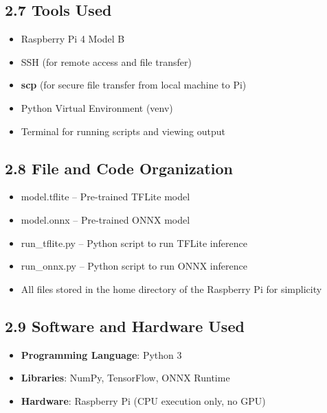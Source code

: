 \documentclass[12pt]{article}
\begin{document}
\subsection*{2.7 Tools Used}
\begin{itemize}
\item Raspberry Pi 4 Model B

\item SSH (for remote access and file transfer)

\item \textbf{scp} (for secure file transfer from local machine to Pi)

\item Python Virtual Environment (venv)

\item Terminal for running scripts and viewing output

\end{itemize}

\subsection*{2.8 File and Code Organization}
\begin{itemize}
\item model.tflite – Pre-trained TFLite model
\item model.onnx – Pre-trained ONNX model
\item run\_tflite.py – Python script to run TFLite inference
\item run\_onnx.py – Python script to run ONNX inference
\item All files stored in the home directory of the Raspberry Pi for simplicity

\end{itemize}

\subsection*{2.9 Software and Hardware Used}
\begin{itemize}

\item \textbf{Programming Language}: Python 3

 \item \textbf{Libraries}: NumPy, TensorFlow, ONNX Runtime

 \item  \textbf{Hardware}: Raspberry Pi (CPU execution only, no GPU)

\end{itemize}
\end{document}

